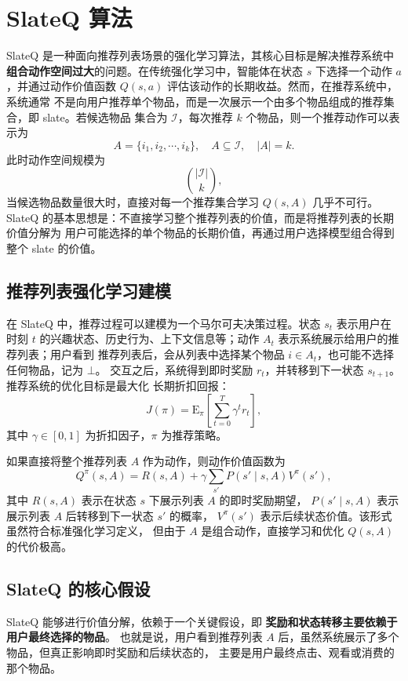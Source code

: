 \documentclass[11pt]{ctexart}
\begin{document}
\section{SlateQ 算法}

SlateQ 是一种面向推荐列表场景的强化学习算法，其核心目标是解决推荐系统中
\textbf{组合动作空间过大}的问题。在传统强化学习中，智能体在状态 $s$ 下选择一个动作
$a$，并通过动作价值函数 $Q(s,a)$ 评估该动作的长期收益。然而，在推荐系统中，系统通常
不是向用户推荐单个物品，而是一次展示一个由多个物品组成的推荐集合，即 slate。若候选物品
集合为 $\mathcal{I}$，每次推荐 $k$ 个物品，则一个推荐动作可以表示为
\[
A=\{i_1,i_2,\cdots,i_k\}, \quad A\subseteq \mathcal{I}, \quad |A|=k .
\]
此时动作空间规模为
\[
\binom{|\mathcal{I}|}{k},
\]
当候选物品数量很大时，直接对每一个推荐集合学习 $Q(s,A)$ 几乎不可行。
SlateQ 的基本思想是：不直接学习整个推荐列表的价值，而是将推荐列表的长期价值分解为
用户可能选择的单个物品的长期价值，再通过用户选择模型组合得到整个 slate 的价值。

\subsection{推荐列表强化学习建模}

在 SlateQ 中，推荐过程可以建模为一个马尔可夫决策过程。状态 $s_t$ 表示用户在时刻 $t$
的兴趣状态、历史行为、上下文信息等；动作 $A_t$ 表示系统展示给用户的推荐列表；用户看到
推荐列表后，会从列表中选择某个物品 $i\in A_t$，也可能不选择任何物品，记为 $\bot$。
交互之后，系统得到即时奖励 $r_t$，并转移到下一状态 $s_{t+1}$。推荐系统的优化目标是最大化
长期折扣回报：
\[
J(\pi)=
\mathrm{E}_{\pi}
\left[
\sum_{t=0}^{T}\gamma^t r_t
\right],
\]
其中 $\gamma\in[0,1]$ 为折扣因子，$\pi$ 为推荐策略。

如果直接将整个推荐列表 $A$ 作为动作，则动作价值函数为
\[
Q^{\pi}(s,A)
=
R(s,A)
+
\gamma
\sum_{s'}P(s'\mid s,A)V^{\pi}(s'),
\]
其中 $R(s,A)$ 表示在状态 $s$ 下展示列表 $A$ 的即时奖励期望，
$P(s'\mid s,A)$ 表示展示列表 $A$ 后转移到下一状态 $s'$ 的概率，
$V^{\pi}(s')$ 表示后续状态价值。该形式虽然符合标准强化学习定义，
但由于 $A$ 是组合动作，直接学习和优化 $Q(s,A)$ 的代价极高。

\subsection{SlateQ 的核心假设}

SlateQ 能够进行价值分解，依赖于一个关键假设，即
\textbf{奖励和状态转移主要依赖于用户最终选择的物品}。
也就是说，用户看到推荐列表 $A$ 后，虽然系统展示了多个物品，但真正影响即时奖励和后续状态的，
主要是用户最终点击、观看或消费的那个物品。
\end{document}
